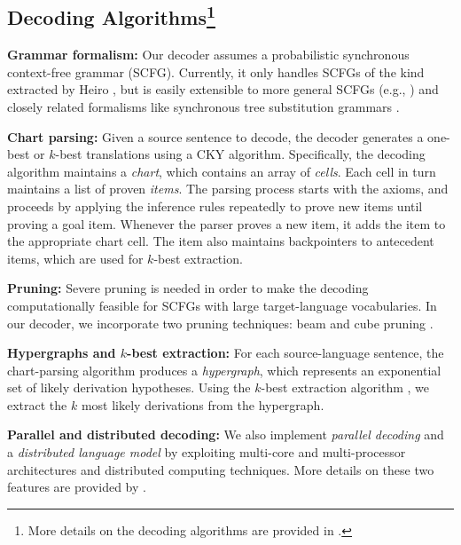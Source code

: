 \documentclass[11pt]{article}
\begin{document}
\subsection{Decoding Algorithms\footnote{More details on the decoding algorithms are provided in \cite{Li-PBML}.}}

\textbf{Grammar formalism:} Our decoder assumes a probabilistic synchronous context-free grammar (SCFG). Currently, it only handles SCFGs of the kind extracted by Heiro \cite{Chiang2007}, but is easily extensible to more general SCFGs (e.g., \cite{Galley2006}) and closely related formalisms like synchronous tree substitution grammars \cite{Eisner2003}.


\textbf{Chart parsing:} Given a source sentence to decode, the decoder generates a one-best or $k$-best translations using a CKY algorithm. Specifically,
the decoding algorithm  maintains a \emph{chart}, which contains an array of \emph{cells}. Each cell in turn maintains a list of proven \emph{items}. The parsing process starts with the axioms, and proceeds by applying the inference rules repeatedly to prove new items until proving a goal item. Whenever the parser proves a new item, it adds the item to the appropriate chart cell. The item also maintains backpointers to antecedent items, which are used for $k$-best extraction.

\textbf{Pruning:} Severe pruning is needed in order to make the decoding computationally feasible for SCFGs with large target-language vocabularies. In our decoder, we incorporate two pruning techniques: beam and cube pruning \cite{Chiang2007}.

\textbf{Hypergraphs and $k$-best extraction:}
For each source-language sentence, the chart-parsing algorithm produces a \emph{hypergraph}, which represents an exponential set of likely derivation hypotheses. Using the $k$-best extraction algorithm \cite{Huang2005}, we extract the $k$ most likely derivations from the hypergraph.

\textbf{Parallel and distributed decoding:}
We also implement \emph{parallel decoding} and a \emph{distributed language model} by exploiting multi-core and multi-processor architectures and distributed computing techniques. More details on these two features are provided by .
\end{document}
